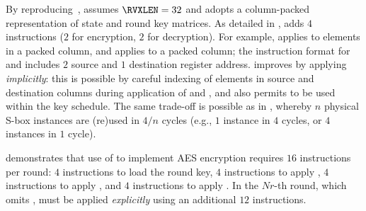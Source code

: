 
By reproducing~\cite[Section 4.3]{TilGro:06},
assumes 
$\RVXLEN = 32$
and adopts a 
column-packed 
representation of state and round key matrices.
As detailed in
,
adds
$ 4$
instructions ($2$ for encryption, $2$ for decryption).
For example,
applies 
to elements in   a packed column,
and
applies 
to               a packed column;
the instruction format for
and
includes $2$ source and $1$ destination register address.
 improves  by applying  
{\em implicitly}:
this is possible by careful indexing of elements in source and destination
columns during application of  and ,
and also permits
to be used within the key schedule.
The same trade-off is possible as in , whereby
$n$ physical S-box instances are (re)used in $4/n$ cycles
(e.g., $1$ instance in $4$ cycles, or $4$ instances in $1$ cycle).

demonstrates that use of  to implement AES encryption requires
$16$ instructions per round:
$ 4$            
     instructions to load the round key,
$ 4$            
     instructions to apply ,
$ 4$   
     instructions to apply ,
     and
$ 4$   
     instructions to apply .
In the $Nr$-th round, which omits ,
 must be applied
{\em explicitly}
using an additional $12$ instructions.

